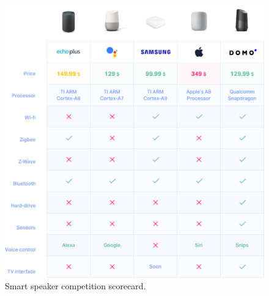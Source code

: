 \begin{figure}
	\includegraphics[width=\linewidth, trim= 0cm 0cm 0cm 0cm, clip]{Figures/domoD.png}
	\caption{Smart speaker competition scorecard.}
	\label{fig:domoD}
\end{figure}

